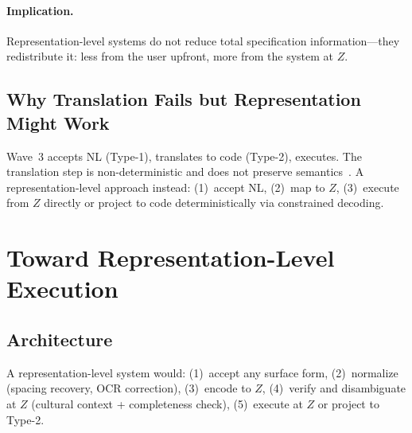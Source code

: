 \documentclass[11pt]{article}
\theoremstyle{definition}
\begin{document}
\paragraph{Implication.}
Representation-level systems do not reduce total specification information---they redistribute it: less from the user upfront, more from the system at $Z$.

\subsection{Why Translation Fails but Representation Might Work}

Wave~3 accepts NL (Type-1), translates to code (Type-2), executes. The translation step is non-deterministic and does not preserve semantics~\cite{cheung2025translation}. A representation-level approach instead: (1)~accept NL, (2)~map to $Z$, (3)~execute from $Z$ directly or project to code deterministically via constrained decoding.


\section{Toward Representation-Level Execution}\label{sec:toward}

\subsection{Architecture}

A representation-level system would: (1)~accept any surface form, (2)~normalize (spacing recovery, OCR correction), (3)~encode to $Z$, (4)~verify and disambiguate at $Z$ (cultural context + completeness check), (5)~execute at $Z$ or project to Type-2.
\end{document}
